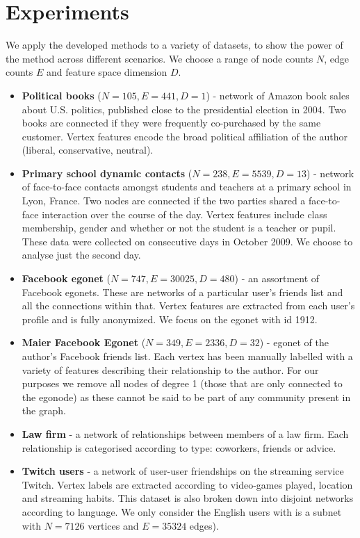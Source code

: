 \section{Experiments}

We apply the developed methods to a variety of datasets, to show the power of the method across different scenarios. We choose a range of node counts $N$, edge counts $E$ and feature space dimension $D$.

\begin{itemize}
	\item \textbf{Political books} \cite{polbooks} ($N=105, E=441, D=1$) - network of Amazon book sales about U.S. politics, published close to the presidential election in 2004. Two books are connected if they were frequently co-purchased by the same customer. Vertex features encode the broad political affiliation of the author (liberal, conservative, neutral).
		
	\item \textbf{Primary school dynamic contacts} \cite{schools} ($N=238, E=5539, D=13$) - network of face-to-face contacts amongst students and teachers at a primary school in Lyon, France. Two nodes are connected if the two parties shared a face-to-face interaction over the course of the day. Vertex features include class membership, gender and whether or not the student is a teacher or pupil. These data were collected on consecutive days in October 2009. We choose to analyse just the second day.
	
	\item \textbf{Facebook egonet} \cite{fb-snap} ($N=747, E=30025, D=480$) - an assortment of Facebook egonets. These are networks of a particular user's friends list and all the connections within that. Vertex features are extracted from each user's profile and is fully anonymized. We focus on the egonet with id 1912.
	
	\item \textbf{Maier Facebook Egonet} \cite{FB-Maier}  ($N=349, E=2336, D=32$) - egonet of the author's Facebook friends list. Each vertex has been manually labelled with a variety of features describing their relationship to the author. For our purposes we remove all nodes of degree 1 (those that are only connected to the egonode) as these cannot be said to be part of any community present in the graph.
		
	\item \textbf{Law firm} \cite{LawFirm} - a network of relationships between members of a law firm. Each relationship is categorised according to type: coworkers, friends or advice.
	
	\item \textbf{Twitch users} \cite{twitch} - a network of user-user friendships on the streaming service Twitch. Vertex labels are extracted according to video-games played, location and streaming habits. This dataset is also broken down into disjoint networks according to language. We only consider the English users with is a subnet with $N=7126$ vertices and $E=35324$ edges).

\end{itemize}


